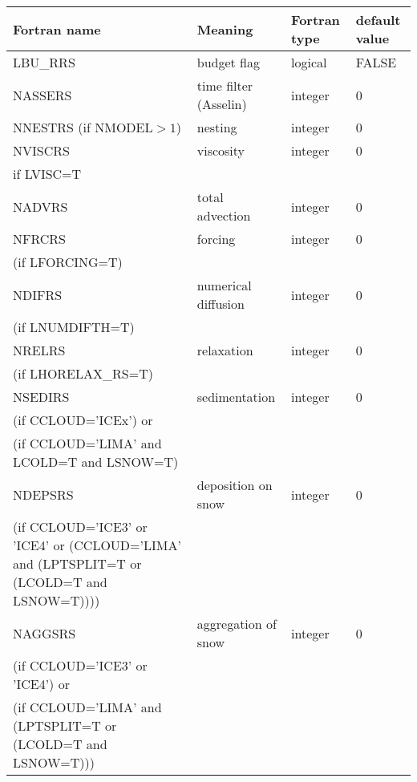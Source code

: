 \begin{longtable} {|p{}|p{}|>{\centering}p{}|p{}<{\centering}|}
\hline
Fortran name & Meaning & Fortran type & default value \\
\hline \hline
\endhead
LBU\_RRS & budget flag & logical & FALSE\index{LBU\_RRS!\innam{NAM\_BU\_RRS}} \\\hline
NASSERS  & time filter (Asselin)   & integer  &  0 \index{NASSERS!\innam{NAM\_BU\_RRS}} \\\hline
NNESTRS (if NMODEL$>1$) & nesting           & integer  &  0 \index{NNESTRS!\innam{NAM\_BU\_RRS}} \\\hline
NVISCRS  & viscosity         & integer  &  0 \index{NVISCRS!\innam{NAM\_BU\_RRS}}\\
if LVISC=T &  &   &   \\\hline
NADVRS   & total advection   & integer  &  0 \index{NADVRS!\innam{NAM\_BU\_RRS}}\\\hline
NFRCRS   & forcing           & integer  &  0 \index{NFRCRS!\innam{NAM\_BU\_RRS}} \\ \nopagebreak
(if LFORCING=T) &  &   &   \\\hline
NDIFRS   & numerical diffusion & integer  &  0 \index{NDIFRS!\innam{NAM\_BU\_RRS}} \\ \nopagebreak
(if LNUMDIFTH=T) &  &   &   \\\hline
NRELRS   & relaxation        & integer  &  0 \index{NRELRS!\innam{NAM\_BU\_RRS}}\\ \nopagebreak
(if LHORELAX\_RS=T) &  &   &   \\\hline
NSEDIRS  & sedimentation & integer  &  0 \index{NSEDIRS!\innam{NAM\_BU\_RRS}}\\ \nopagebreak
(if CCLOUD='ICEx') or & &   &  \\ \nopagebreak
(if CCLOUD='LIMA' and LCOLD=T and LSNOW=T) & &   &  \\\hline
NDEPSRS  & deposition on snow & integer  &  0 \index{NDEPSRS!\innam{NAM\_BU\_RRS}}\\ \nopagebreak
(if CCLOUD='ICE3' or 'ICE4' or (CCLOUD='LIMA' and (LPTSPLIT=T or (LCOLD=T and LSNOW=T)))) & &   &  \\\hline
NAGGSRS  & aggregation of snow    & integer  &  0 \index{NAGGSRS!\innam{NAM\_BU\_RRS}}\\ \nopagebreak
(if CCLOUD='ICE3' or 'ICE4') or & &   &  \\ \nopagebreak
(if CCLOUD='LIMA' and (LPTSPLIT=T or (LCOLD=T and LSNOW=T))) & &   &  \\\hline

\end{longtable}
